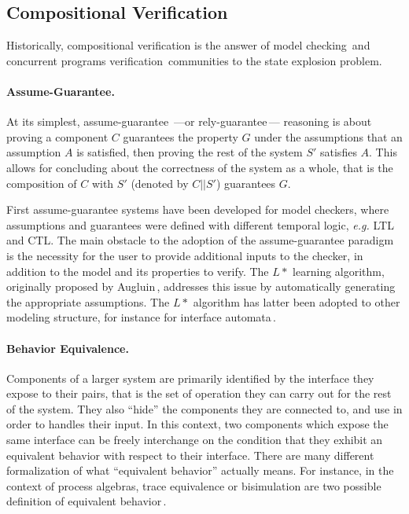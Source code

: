 \subsection{Compositional Verification}
\label{subsec:sota:compverif}

Historically, compositional verification is the answer of model
checking\,\cite{mcmillan1989compositional} and concurrent programs
verification\,\cite{jones1983tentative} communities to the state explosion
problem.

\paragraph{Assume-Guarantee.}
%
At its simplest, assume-guarantee\,\cite{pnueli1985ag} ---or
rely-guarantee\,\cite{jones1983tentative}--- reasoning is about proving a
component \( C \) guarantees the property \( G \) under the assumptions that an
assumption \( A \) is satisfied, then proving the rest of the system \( S' \)
satisfies \( A \).
%
This allows for concluding about the correctness of the system as a whole, that
is the composition of \( C \) with \( S' \) (denoted by \( C || S' \))
guarantees \( G \).

First assume-guarantee systems have been developed for model checkers, where
assumptions and guarantees were defined with different temporal logic,
\emph{e.g.} LTL and CTL.
%
The main obstacle to the adoption of the assume-guarantee paradigm is the
necessity for the user to provide additional inputs to the checker, in addition
to the model and its properties to verify.
%
The \( L* \) learning algorithm, originally proposed by
Augluin\,\cite{angluin1987lstart}, addresses this issue by automatically
generating the appropriate assumptions.
%
The \( L* \) algorithm has latter been adopted to other modeling structure, for
instance for interface automata\,\cite{emmi2008assume}.

\paragraph{Behavior Equivalence.}
%
Components of a larger system are primarily identified by the interface they
expose to their pairs, that is the set of operation they can carry out for the
rest of the system.
%
They also ``hide'' the components they are connected to, and use in order to
handles their input.
%
In this context, two components which expose the same interface can be freely
interchange on the condition that they exhibit an equivalent behavior with
respect to their interface.
%
There are many different formalization of what ``equivalent behavior'' actually
means.
%
For instance, in the context of process algebras, trace equivalence or
bisimulation are two possible definition of equivalent
behavior\,\cite{fokkink2013pa}.


